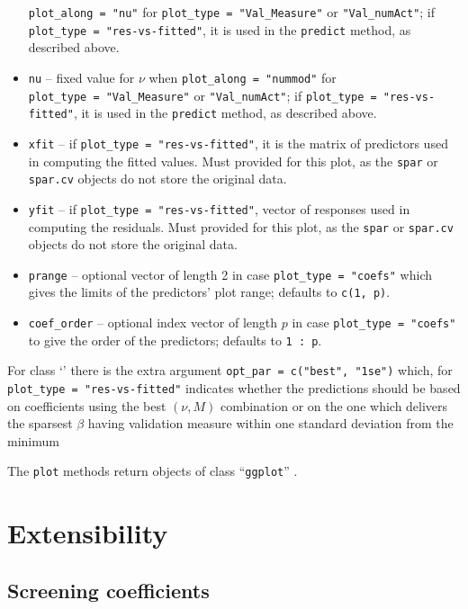 \documentclass[
  article]{jss}
\newcommand{\class}[1]{`\code{#1}'}
\begin{document}
\begin{itemize}
  \texttt{plot\_along\ =\ "nu"} for
  \texttt{plot\_type\ =\ "Val\_Measure"} or \texttt{"Val\_numAct"}; if
  \texttt{plot\_type\ =\ "res-vs-fitted"}, it is used in the
  \texttt{predict} method, as described above.
\item
  \texttt{nu} -- fixed value for \(\nu\) when
  \texttt{plot\_along\ =\ "nummod"} for
  \texttt{plot\_type\ =\ "Val\_Measure"} or \texttt{"Val\_numAct"}; if
  \texttt{plot\_type\ =\ "res-vs-fitted"}, it is used in the
  \texttt{predict} method, as described above.
\item
  \texttt{xfit} -- if \texttt{plot\_type\ =\ "res-vs-fitted"}, it is the
  matrix of predictors used in computing the fitted values. Must
  provided for this plot, as the \texttt{spar} or \texttt{spar.cv}
  objects do not store the original data.
\item
  \texttt{yfit} -- if \texttt{plot\_type\ =\ "res-vs-fitted"}, vector of
  responses used in computing the residuals. Must provided for this
  plot, as the \texttt{spar} or \texttt{spar.cv} objects do not store
  the original data.
\item
  \texttt{prange} -- optional vector of length 2 in case
  \texttt{plot\_type\ =\ "coefs"} which gives the limits of the
  predictors' plot range; defaults to \texttt{c(1,\ p)}.
\item
  \texttt{coef\_order} -- optional index vector of length \(p\) in case
  \texttt{plot\_type\ =\ "coefs"} to give the order of the predictors;
  defaults to \texttt{1\ :\ p}.
\end{itemize}

For class \class{spar.cv} there is the extra argument
\texttt{opt\_par\ =\ c("best",\ "1se")} which, for
\texttt{plot\_type\ =\ "res-vs-fitted"} indicates whether the
predictions should be based on coefficients using the best \((\nu, M)\)
combination or on the one which delivers the sparsest \(\beta\) having
validation measure within one standard deviation from the minimum

The \texttt{plot} methods return objects of class ``\texttt{ggplot}''
\citep{ggplotR}.

\section{Extensibility}\label{sec-extensibility}

\subsection{Screening coefficients}\label{sec-extensscrcoef}
\end{document}
